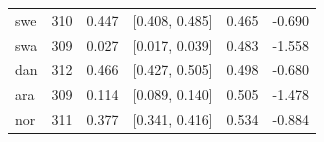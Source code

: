 \begin{longtable}{lrrrrr}
swe & 310 & 0.447 & [0.408, 0.485] & 0.465 & -0.690\\

swa & 309 & 0.027 & [0.017, 0.039] & 0.483 & -1.558\\

dan & 312 & 0.466 & [0.427, 0.505] & 0.498 & -0.680\\

ara & 309 & 0.114 & [0.089, 0.140] & 0.505 & -1.478\\

nor & 311 & 0.377 & [0.341, 0.416] & 0.534 & -0.884\\

\end{longtable}

\endgroup

\begingroup\footnotesize\setlength{\tabcolsep}{3pt}\renewcommand{\arraystretch}{1.12}

